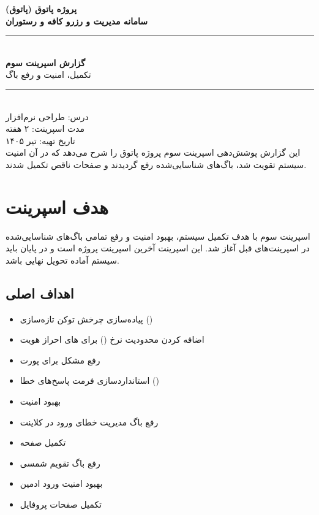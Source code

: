 \documentclass[12pt, a4paper]{article}
\begin{document}

\begin{titlepage}
\centering
\vspace*{2cm}
{\LARGE\bfseries پروژه پاتوق (پاتوق)\\[0.5em]}
{\Large\bfseries سامانه مدیریت و رزرو کافه و رستوران\\[2em]}
\rule{\linewidth}{0.5mm}\\[1em]
{\huge\bfseries\color{primaryorange} گزارش اسپرینت سوم}\\[0.5em]
{\Large تکمیل، امنیت و رفع باگ}\\[1em]
\rule{\linewidth}{0.5mm}\\[2em]
{\large درس: طراحی نرم‌افزار\\[0.5em]}
{\large مدت اسپرینت: ۲ هفته\\[0.5em]}
{\large تاریخ تهیه: تیر ۱۴۰۵}\\[3em]
\vfill
{\normalsize\color{darkgray}
این گزارش پوشش‌دهی اسپرینت سوم پروژه پاتوق را شرح می‌دهد که
در آن امنیت سیستم تقویت شد، باگ‌های شناسایی‌شده رفع گردیدند
و صفحات ناقص تکمیل شدند.}
\end{titlepage}

\tableofcontents
\newpage

\section{هدف اسپرینت}

اسپرینت سوم با هدف تکمیل سیستم، بهبود امنیت و رفع تمامی باگ‌های شناسایی‌شده
در اسپرینت‌های قبل آغاز شد. این اسپرینت آخرین اسپرینت پروژه است و در پایان
باید سیستم آماده تحویل نهایی باشد.

\subsection{اهداف اصلی}
\begin{itemize}[rightmargin=0.5cm]
  \item پیاده‌سازی چرخش توکن تازه‌سازی ()
  \item اضافه کردن محدودیت نرخ () برای های احراز هویت
  \item رفع مشکل  برای پورت 
  \item استانداردسازی فرمت پاسخ‌های خطا ()
  \item بهبود امنیت 
  \item رفع باگ مدیریت خطای ورود در کلاینت
  \item تکمیل صفحه 
  \item رفع باگ تقویم شمسی
  \item بهبود امنیت ورود ادمین
  \item تکمیل صفحات پروفایل
\end{itemize}
\end{document}
